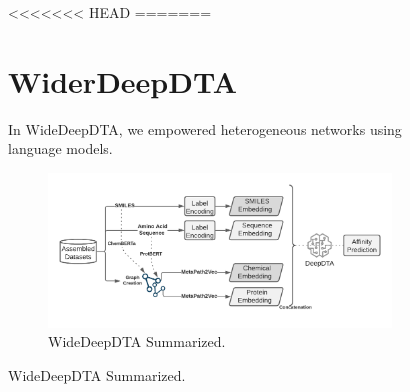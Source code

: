 \begin{figure}[h]
<<<<<<< HEAD
=======
\section{WiderDeepDTA}
In WideDeepDTA, we empowered heterogeneous networks using language models. 


\begin{figure}
    \centering
        \includegraphics[width=\linewidth]{chapters/materials_and_methods/figures/WiderDeepDTA.png}
    \caption{WideDeepDTA Summarized.}
    \label{fig:widerdeepdta}
\end{figure}



\end{figure}

